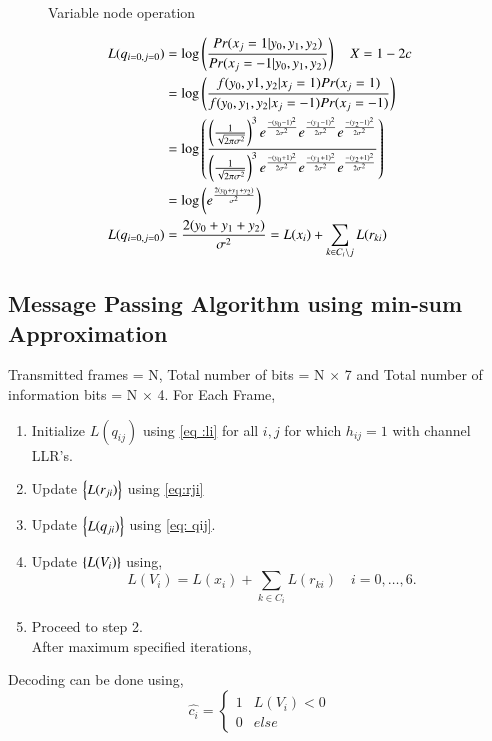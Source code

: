 \documentclass[journal,12pt,twocolumn]{IEEEtran}
\begin{document}
\begin{enumerate}
\begin{figure}[!ht]
\begin{center}
\end{center}
\caption{Variable node operation}
\label{fig : var}
\end{figure}
\begin{align}
L(q_{i=0,j=0})&=\log \left(\frac{Pr(x_j=1|y_0,y_1,y_2)}{Pr(x_j=-1|y_0,y_1,y_2)}\right) \quad X=1-2c\\
&= \log \left(\frac{f(y_0,y1,y_2|x_j=1)Pr(x_j=1)}{f(y_0,y_1,y_2|x_j=-1)Pr(x_j=-1)}\right) \\
&= \log \left(\frac{\left(\frac{1}{\sqrt{2\pi\sigma^2}}\right)^3e^{\frac{-(y_0-1)^2}{2\sigma^2}}e^{\frac{-(y_1-1)^2}{2\sigma^2}}e^{\frac{-(y_2-1)^2}{2\sigma^2}}}{\left(\frac{1}{\sqrt{2\pi\sigma^2}}\right)^3e ^{\frac{-(y_0+1)^2}{2\sigma^2}}e ^{\frac{-(y_1+1)^2}{2\sigma^2}}e ^{\frac{-(y_2+1)^2}{2\sigma^2}} }  \right) \\
&=\log \left(e^{\frac{2(y_0+y_1+y_2)}{\sigma^2}}\right) \\
L(q_{i=0,j=0})&= \frac{2(y_0+y_1+y_2)}{\sigma^2}=L(x_i)+\sum_{k \in C_i\setminus j} L(r_{ki}) \label{eq: qij}
\end{align}
\end{enumerate}

\subsection{Message Passing Algorithm using min-sum Approximation}
Transmitted frames = N, Total number of bits = N $\times$ 7 and Total number of information bits = N $\times$ 4.
For Each Frame,
\begin{enumerate}
\item Initialize $L(q_{ij})$ using \eqref{eq :li} for all $i,j$ for which $h_{ij}=1$ with channel LLR's.
\item Update $\left\{L(r_{ji})\right\}$ using \eqref{eq:rji}
\item Update $\left\{L(q_{ji})\right\}$ using \eqref{eq: qij}.
\item Update $\left\{L(V_i)\right\}$ using,
\begin{equation}
L(V_i)=L(x_i)+\sum_{k \in C_i} L(r_{ki}) \quad i=0,\dots,6.
\end{equation}
\item Proceed to step 2.\\
After maximum specified iterations,

\end{enumerate}
Decoding can be done using,
\begin{equation}
\hat{c_i} = \begin{cases}
1 & L(V_i) < 0\\
0 & else
\end{cases}
\end{equation}
%
\end{document}
